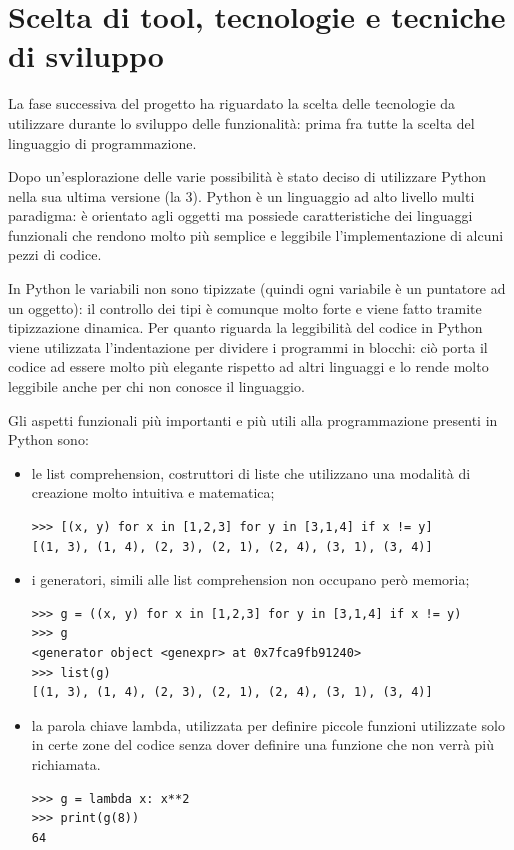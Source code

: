 \documentclass[12pt]{report}
\begin{document}
\newpage
\section{Scelta di tool, tecnologie e tecniche di sviluppo}

La fase successiva del progetto ha riguardato la scelta delle tecnologie da utilizzare durante lo sviluppo delle funzionalità: prima fra tutte la scelta del linguaggio di programmazione.

Dopo un'esplorazione delle varie possibilità è stato deciso di utilizzare Python nella sua ultima versione (la 3). Python è un linguaggio ad alto livello multi paradigma: è orientato agli oggetti ma possiede caratteristiche dei linguaggi funzionali che rendono molto più semplice e leggibile l'implementazione di alcuni pezzi di codice.

In Python le variabili non sono tipizzate (quindi ogni variabile è un puntatore ad un oggetto): il controllo dei tipi è comunque molto forte e viene fatto tramite tipizzazione dinamica.
Per quanto riguarda la leggibilità del codice in Python viene utilizzata l'indentazione per dividere i programmi in blocchi: ciò porta il codice ad essere molto più elegante rispetto ad altri linguaggi e lo rende molto leggibile anche per chi non conosce il linguaggio.

Gli aspetti funzionali più importanti e più utili alla programmazione presenti in Python sono:
\begin{itemize}
\item le list comprehension, costruttori di liste che utilizzano una modalità di creazione molto intuitiva e matematica;
\begin{lstlisting}[label=codice,caption=Esempio di List Comprehension, frame=single]
>>> [(x, y) for x in [1,2,3] for y in [3,1,4] if x != y]
[(1, 3), (1, 4), (2, 3), (2, 1), (2, 4), (3, 1), (3, 4)] 
\end{lstlisting}

\vspace{5mm} %
\item i generatori, simili alle list comprehension non occupano però memoria;
\begin{lstlisting}[label=codice,caption=Esempio di Generatore, frame=single]
>>> g = ((x, y) for x in [1,2,3] for y in [3,1,4] if x != y)
>>> g
<generator object <genexpr> at 0x7fca9fb91240>
>>> list(g)
[(1, 3), (1, 4), (2, 3), (2, 1), (2, 4), (3, 1), (3, 4)]
\end{lstlisting}

\vspace{5mm} %
\item la parola chiave lambda, utilizzata per definire piccole funzioni utilizzate solo in certe zone del codice senza dover definire una funzione che non verrà più richiamata.
\begin{lstlisting}[label=codice,caption=Esempio di utilizzo della lambda, frame=single]
>>> g = lambda x: x**2
>>> print(g(8))
64
\end{lstlisting}

\vspace{5mm} %
\end{itemize}  
 
\end{document}
